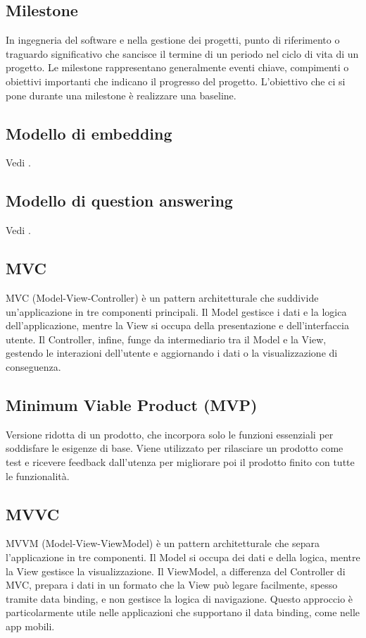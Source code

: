 \subsection*{Milestone}
In ingegneria del software e nella gestione dei progetti, punto di riferimento o traguardo significativo che sancisce il termine di un periodo nel ciclo 
di vita di un progetto. Le milestone rappresentano generalmente eventi chiave, compimenti o obiettivi importanti che indicano il progresso del progetto. 
L’obiettivo che ci si pone durante una milestone è realizzare una baseline.

\hypertarget{sec:modello_di_embedding}{}
\subsection*{Modello di embedding}
Vedi .

\hypertarget{sec:modello_di_question_answering}{}
\subsection*{Modello di question answering}
Vedi .

\hypertarget{sec:MVC}{}
\subsection*{MVC}
MVC (Model-View-Controller) è un pattern architetturale che suddivide un'applicazione in tre componenti principali.
Il Model gestisce i dati e la logica dell'applicazione, mentre la View si occupa della presentazione e dell'interfaccia utente. 
Il Controller, infine, funge da intermediario tra il Model e la View, gestendo le interazioni dell'utente e aggiornando i dati o la visualizzazione di conseguenza.

\hypertarget{sec:MVP}{}
\subsection*{Minimum Viable Product (MVP)}
Versione ridotta di un prodotto, che incorpora solo le funzioni essenziali per soddisfare le esigenze di base. Viene utilizzato per rilasciare un prodotto 
come test e ricevere feedback dall’utenza per migliorare poi il prodotto finito con tutte le funzionalità.

\hypertarget{sec:MVVC}{}
\subsection*{MVVC}
MVVM (Model-View-ViewModel) è un pattern architetturale che separa l'applicazione in tre componenti. 
Il Model si occupa dei dati e della logica, mentre la View gestisce la visualizzazione. 
Il ViewModel, a differenza del Controller di MVC, prepara i dati in un formato che la View può legare facilmente, spesso tramite data binding, e non gestisce la logica di navigazione. 
Questo approccio è particolarmente utile nelle applicazioni che supportano il data binding, come nelle app mobili.
\newpage


